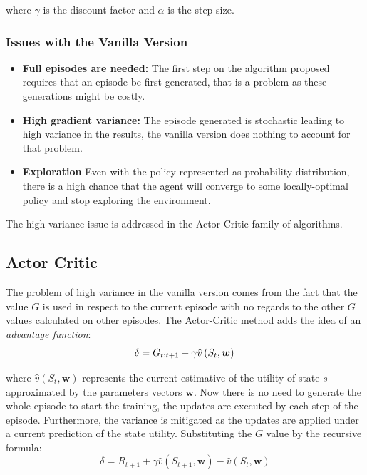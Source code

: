 where $\gamma$ is the discount factor and $\alpha$ is the step size.
 
\subsubsection{Issues with the Vanilla Version}

\begin{itemize}
	\item \textbf{Full episodes are needed:} The first step on the algorithm proposed requires that an episode be first generated, that is a problem as these generations might be costly.
	\item \textbf{High gradient variance:}  The episode generated is stochastic leading to high variance in the results, the vanilla version does nothing to account for that problem.
	\item \textbf{Exploration} Even with the policy represented as probability distribution, there is a high chance that the agent will converge to some locally-optimal policy and stop exploring the environment.
\end{itemize}

The high variance issue is addressed in the Actor Critic family of algorithms.

\subsection{Actor Critic}

The problem of high variance in the vanilla version comes from the fact that  the value $G$ is used in respect to the current episode with no regards to the other $G$ values calculated on other episodes. The Actor-Critic method adds the idea of an \textit{advantage function}:
\begin{equation}
\delta = G_{t:t+1} - \gamma \hat{v}\left(S_t,\bm{w}\right) \\
\end{equation}

where  $\hat{v}\left(S_t,\bm{w}\right)$ represents the current estimative of the utility of state $s$ approximated by the parameters vectors $\bm{w}$. Now there is no need to generate the whole episode to start the training, the updates are executed by each step of the episode. Furthermore, the variance is mitigated as the updates are applied under a current prediction of the state utility. Substituting the $G$ value by the recursive formula:
\begin{equation}
\delta = R_{t+1} + \gamma\hat{v}\left(S_{t+1},\bm{w}\right) - \hat{v}\left(S_t,\bm{w}\right)
\end{equation}

